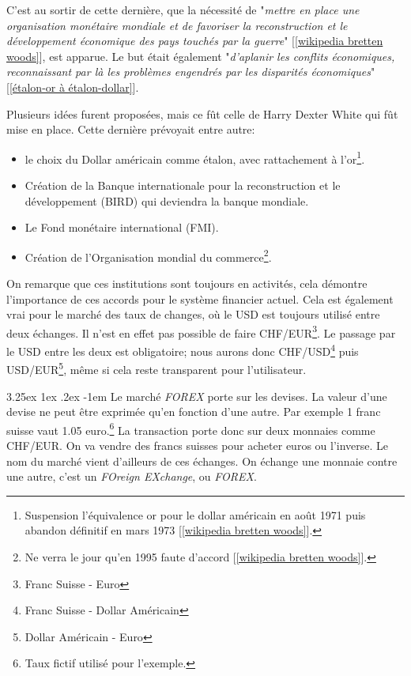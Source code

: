 \documentclass[a4paper, 11pt]{article}
\makeatletter
\renewcommand\paragraph{\@startsection{paragraph}{5}{\z@}%
  {3.25ex \@plus1ex \@minus.2ex}%
  {-1em}%
  {\normalfont\normalsize\bfseries}}
\makeatother
\begin{document}
C'est au sortir de cette dernière, que la nécessité de "\textit{mettre en place une organisation monétaire mondiale et de favoriser la reconstruction et le développement économique des pays touchés par la guerre}" [\ref{wikipedia bretten woods}], est apparue. Le but était également "\textit{d’aplanir les conflits économiques, reconnaissant par là les problèmes engendrés par les disparités économiques}" [\ref{étalon-or à étalon-dollar}].

Plusieurs idées furent proposées, mais ce fût celle de Harry Dexter White qui fût mise en place. Cette dernière prévoyait entre autre:
\begin{itemize}
\item le choix du Dollar américain comme étalon, avec rattachement à l'or\footnote{Suspension l'équivalence or pour le dollar américain en août 1971 puis abandon définitif en mars 1973 [\ref{wikipedia bretten woods}].}.
\item Création de la Banque internationale pour la reconstruction et le développement (BIRD) qui deviendra la banque mondiale.
\item Le Fond monétaire international (FMI).
\item Création de l'Organisation mondial du commerce\footnote{Ne verra le jour qu'en 1995 faute d'accord [\ref{wikipedia bretten woods}].}.
\end{itemize}

On remarque que ces institutions sont toujours en activités, cela démontre l'importance de ces accords pour le système financier actuel. Cela est également vrai pour le marché des taux de changes, où le USD est toujours utilisé entre deux échanges.
Il n'est en effet pas possible de faire CHF/EUR\footnote{Franc Suisse - Euro}. Le passage par le USD entre les deux est obligatoire; nous aurons donc CHF/USD\footnote{Franc Suisse - Dollar Américain} puis USD/EUR\footnote{Dollar Américain - Euro}, même si cela reste transparent pour l'utilisateur.

\paragraph{}
Le marché \textit{FOREX} porte sur les devises. La valeur d'une devise ne peut être exprimée qu'en fonction d'une autre. Par exemple 1 franc suisse vaut 1.05 euro.\footnote{Taux fictif utilisé pour l'exemple.}
La transaction porte donc sur deux monnaies comme CHF/EUR. On va vendre des francs suisses pour acheter euros ou l'inverse.
Le nom du marché vient d'ailleurs de ces échanges. On échange une monnaie contre une autre, c'est un \textit{FOreign EXchange}, ou \textit{FOREX}.
\end{document}
